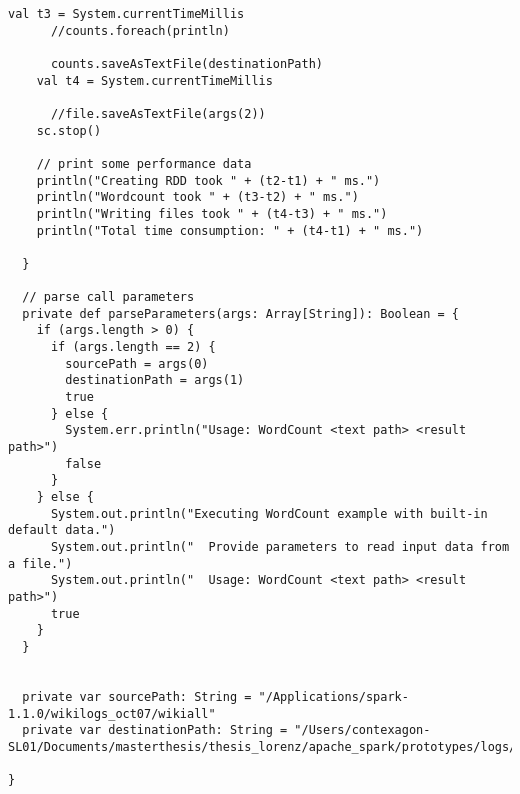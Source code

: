 \begin{lstlisting}[label=sparkwc,caption=Spark-WordCount-Prototyp mit Implementierung mittels MapReduce-Algorithmus ]
    val t3 = System.currentTimeMillis
      //counts.foreach(println)

      counts.saveAsTextFile(destinationPath)
    val t4 = System.currentTimeMillis

      //file.saveAsTextFile(args(2))
    sc.stop()

    // print some performance data
    println("Creating RDD took " + (t2-t1) + " ms.")
    println("Wordcount took " + (t3-t2) + " ms.")
    println("Writing files took " + (t4-t3) + " ms.")
    println("Total time consumption: " + (t4-t1) + " ms.")

  }

  // parse call parameters
  private def parseParameters(args: Array[String]): Boolean = {
    if (args.length > 0) {
      if (args.length == 2) {
        sourcePath = args(0)
        destinationPath = args(1)
        true
      } else {
        System.err.println("Usage: WordCount <text path> <result path>")
        false
      }
    } else {
      System.out.println("Executing WordCount example with built-in default data.")
      System.out.println("  Provide parameters to read input data from a file.")
      System.out.println("  Usage: WordCount <text path> <result path>")
      true
    }
  }


  private var sourcePath: String = "/Applications/spark-1.1.0/wikilogs_oct07/wikiall"
  private var destinationPath: String = "/Users/contexagon-SL01/Documents/masterthesis/thesis_lorenz/apache_spark/prototypes/logs/sparkOutput.out"

}
\end{lstlisting}


